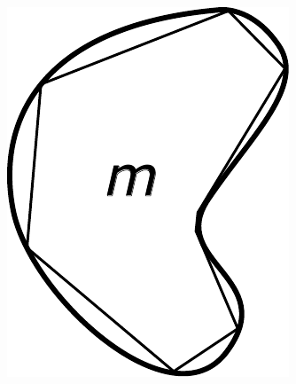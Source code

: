 \documentclass[a4paper, 14pt]{report}
\theoremstyle{definition}
\begin{document}
\begin{figure}[!htp]
\begin{subfigure}{0.20\linewidth}
				\includegraphics[width=1\linewidth]{sampleD_smM}
				\caption{}
				\label{fig:area_d_inner_m}
			\end{subfigure}
			\hfill
			\begin{subfigure}{0.20\linewidth}

\end{subfigure}
\end{figure}
\end{document}
